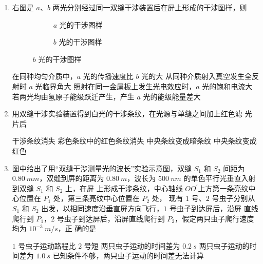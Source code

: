\begin{enumerate}
\item 
{}
右图是 $ a $、$ b $ 两光分别经过同一双缝干涉装置后在屏上形成的干涉图样，则  
\begin{figure}[h!]
	\centering
	\begin{subfigure}{0.4\linewidth}
		\centering
		 
		\caption*{$ a $ 光的干涉图样}\label{}
	\end{subfigure}
	\begin{subfigure}{0.4\linewidth}
		\centering
		 
		\caption*{$ b $ 光的干涉图样}\label{}
	\end{subfigure}
	
\end{figure}

\fourchoices
{在同种均匀介质中，$ a $ 光的传播速度比 $ b $ 光的大}
{从同种介质射入真空发生全反射时 $ a $ 光临界角大}
{照射在同一金属板上发生光电效应时，$ a $ 光的饱和电流大}
{若两光均由氢原子能级跃迁产生，产生 $ a $ 光的能级能量差大}


\item 
{}
用双缝干涉实验装置得到白光的干涉条纹，在光源与单缝之间加上红色滤
光片后  


\fourchoices
{干涉条纹消失}
{彩色条纹中的红色条纹消失}
{中央条纹变成暗条纹}
{中央条纹变成红色}


\item 
{}
图中给出了用“双缝干涉测量光的波长”实验示意图，双缝 $ S_{1} $ 和 $ S_{2} $ 间距为
$ 0.80 \ mm $，双缝到屏的距离为 $ 0.80 \ m $，波长为 $ 500 \ nm $ 的单色平行光垂直入射到双缝 $ S_{1} $ 和 $ S_{2} $ 上，在屏
上形成干涉条纹，中心轴线 $ OO ^{\prime} $上方第一条亮纹中心位置在 $ P_{1} $ 处，第三条亮纹中心位置在 $ P_{2} $ 处，
现有 $ 1 $ 号、$ 2 $ 号虫子分别从 $ S_{1} $ 和 $ S_{2} $ 出发，以相同速度沿垂直屏方向飞行，$ 1 $ 号虫子到达屏后，沿屏
直线爬行到 $ P_{1} $，$ 2 $ 号虫子到达屏后，沿屏直线爬行到 $ P_{2} $，假定两只虫子爬行速度均为 $ 10^{-3} \ m /s $，正
确的是  
\begin{figure}[h!]
	\centering
	
\end{figure}

\fourchoices
{$ 1 $ 号虫子运动路程比 $ 2 $ 号短}
{两只虫子运动的时间差为 $ 0.2 \ s $}
{两只虫子运动的时间差为 $ 1.0 \ s $}
{已知条件不够，两只虫子运动的时间差无法计算}




\end{enumerate}
